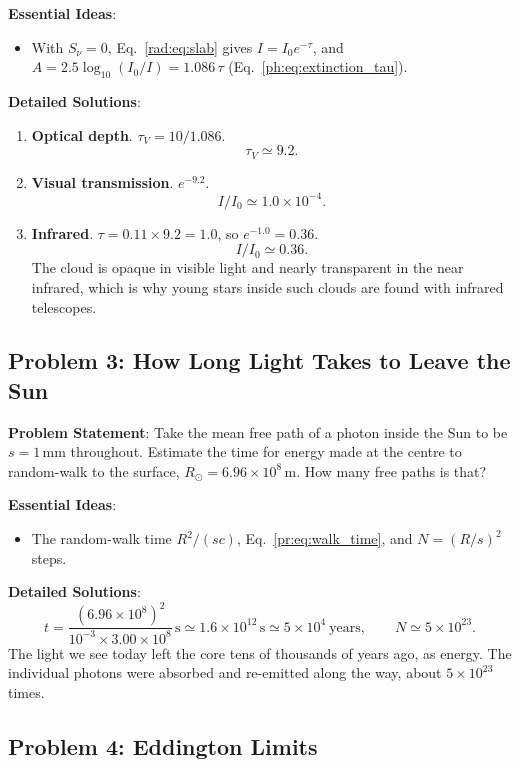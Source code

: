 \textbf{Essential Ideas}:
\begin{itemize}
	\item With $S_\nu=0$, Eq.~\eqref{rad:eq:slab} gives $I=I_0e^{-\tau}$, and $A=2.5\log_{10}(I_0/I)=1.086\,\tau$ (Eq.~\eqref{ph:eq:extinction_tau}).
\end{itemize}

\textbf{Detailed Solutions}:
\begin{enumerate}[label=(\alph*)]
	\item \textbf{Optical depth}. $\tau_V=10/1.086$.
	\[
	\boxed{\tau_V\simeq9.2.}
	\]
	\item \textbf{Visual transmission}. $e^{-9.2}$.
	\[
	\boxed{I/I_0\simeq1.0\times10^{-4}.}
	\]
	\item \textbf{Infrared}. $\tau=0.11\times9.2=1.0$, so $e^{-1.0}=0.36$.
	\[
	\boxed{I/I_0\simeq0.36.}
	\]
	The cloud is opaque in visible light and nearly transparent in the near infrared, which is why young stars inside such clouds are found with infrared telescopes.
\end{enumerate}

\subsection{Problem 3: How Long Light Takes to Leave the Sun}
\label{rad:prob:escape}

\textbf{Problem Statement}: Take the mean free path of a photon inside the Sun to be $s=1\,\mathrm{mm}$ throughout. Estimate the time for energy made at the centre to random-walk to the surface, $R_\odot=6.96\times10^8\,\mathrm m$. How many free paths is that?

\textbf{Essential Ideas}:
\begin{itemize}
	\item The random-walk time $R^2/(sc)$, Eq.~\eqref{pr:eq:walk_time}, and $N=(R/s)^2$ steps.
\end{itemize}

\textbf{Detailed Solutions}:
\[
\boxed{t=\frac{(6.96\times10^8)^2}{10^{-3}\times3.00\times10^8}\,\mathrm s\simeq1.6\times10^{12}\,\mathrm s\simeq5\times10^4\ \text{years},\qquad N\simeq5\times10^{23}.}
\]
The light we see today left the core tens of thousands of years ago, as energy. The individual photons were absorbed and re-emitted along the way, about $5\times10^{23}$ times.

\subsection{Problem 4: Eddington Limits}
\label{rad:prob:eddington}

